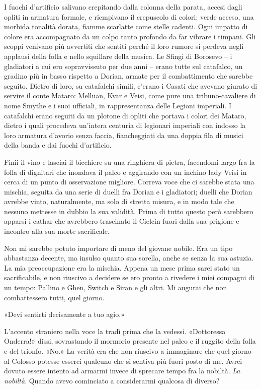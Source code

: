 I fuochi d'artificio salivano crepitando dalla colonna della parata,
accesi dagli opliti in armatura formale, e riempivano il crepuscolo di
colori: verde acceso, una morbida tonalità dorata, fiamme scarlatte come
stelle cadenti. Ogni impatto di colore era accompagnato da un colpo
tanto profondo da far vibrare i timpani. Gli scoppi venivano più
avvertiti che sentiti perché il loro rumore si perdeva negli applausi
della folla e nello squillare della musica. Le Sfingi di Borosevo -- i
gladiatori a cui ero sopravvissuto per due anni -- erano tutte sul
catafalco, un gradino più in basso rispetto a Dorian, armate per il
combattimento che sarebbe seguito. Dietro di loro, su catafalchi simili,
c'erano i Casati che avevano giurato di servire il conte Mataro:
Melluan, Kvar e Veisi, come pure una tribuno-cavaliere di nome Smythe e
i suoi ufficiali, in rappresentanza delle Legioni imperiali. I
catafalchi erano seguiti da un plotone di opliti che portava i colori
dei Mataro, dietro i quali procedeva un'intera centuria di legionari
imperiali con indosso la loro armatura d'avorio senza faccia,
fiancheggiati da una doppia fila di musici della banda e dai fuochi
d'artificio.

Finii il vino e lasciai il bicchiere su una ringhiera di pietra,
facendomi largo fra la folla di dignitari che inondava il palco e
aggirando con un inchino lady Veisi in cerca di un punto di osservazione
migliore. Correva voce che ci sarebbe stata una mischia, seguita da una
serie di duelli fra Dorian e i gladiatori; duelli che Dorian avrebbe
vinto, naturalmente, ma solo di stretta misura, e in modo tale che
nessuno mettesse in dubbio la sua validità. Prima di tutto questo però
sarebbero apparsi i cathar che avrebbero trascinato il Cielcin fuori
dalla sua prigione e incontro alla sua morte sacrificale.

Non mi sarebbe potuto importare di meno del giovane nobile. Era un tipo
abbastanza decente, ma insulso quanto sua sorella, anche se senza la sua
astuzia. La mia preoccupazione era la mischia. Appena un mese prima
sarei stato un sacrificabile, e non riuscivo a decidere se ero pronto a
rivedere i miei compagni di un tempo: Pallino e Ghen, Switch e Siran e
gli altri. Mi augurai che non combattessero tutti, quel giorno.

«Devi sentirti decisamente a tuo agio.»

L'accento straniero nella voce la tradì prima che la vedessi.
«Dottoressa Onderra!» dissi, sovrastando il mormorio presente nel palco
e il ruggito della folla e del trionfo. «No.» La verità era che non
riuscivo a immaginare che quel giorno al Colosso potesse esserci
qualcuno che si sentiva più fuori posto di me. Avrei dovuto essere
intento ad armarmi invece di sprecare tempo fra la nobiltà. \emph{La
	nobiltà}. Quando avevo cominciato a considerarmi qualcosa di diverso?

